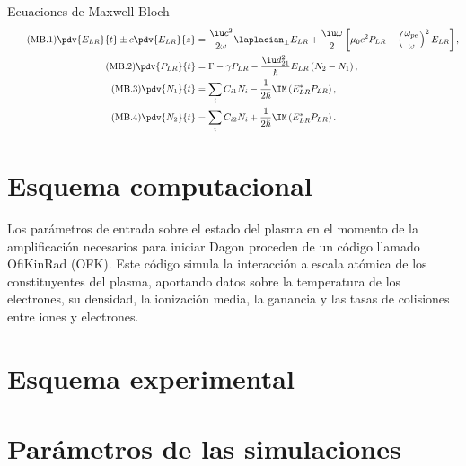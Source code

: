 \begin{footheorem*}{Ecuaciones de Maxwell-Bloch}
  \begin{align}
    \tag{MB.1}
    \pdv{E_{LR}}{t} \pm c \pdv{E_{LR}}{z} &= \frac{\iu c^{2}}{2 \omega}\laplacian_{\perp}E_{LR} + \frac{\iu \omega}{2} \left[\mu_{0}c^{2}P_{LR} - \left(\frac{\omega_{pe}}{\omega}\right)^{2}E_{LR}\right], \\
    \tag{MB.2}
    \pdv{P_{LR}}{t} &= \Gamma - \gamma P_{LR} - \frac{\iu d^{2}_{21}}{\hslash }E_{LR}\left(N_{2}-N_{1}\right), \\
    \tag{MB.3}
    \pdv{N_{1}}{t} &= \sum_{i} C_{i1}N_{i} - \frac{1}{2 \hslash }\IM \left(E_{LR}^{*}P_{LR}\right), \\
    \tag{MB.4}
    \pdv{N_{2}}{t} &= \sum_{i} C_{i2}N_{i} + \frac{1}{2 \hslash }\IM \left(E_{LR}^{*}P_{LR}\right).
  \end{align}
\end{footheorem*}

\section{Esquema computacional}\label{sec:3.2}
Los parámetros de entrada sobre el estado del plasma en el momento de la amplificación necesarios para iniciar Dagon proceden de un código llamado OfiKinRad (OFK). Este código simula la interacción a escala atómica de los constituyentes del plasma, aportando datos sobre la temperatura de los electrones, su densidad, la ionización media, la ganancia y las tasas de colisiones entre iones y electrones.

\section{Esquema experimental}\label{sec:3.3}

\section{Parámetros de las simulaciones}\label{sec:3.4}
